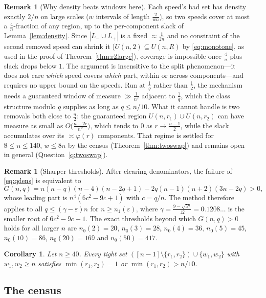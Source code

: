 \documentclass[11pt]{article}
\newtheorem{corollary}[theorem]{Corollary}
\theoremstyle{definition}
\newtheorem{remark}[theorem]{Remark}
\begin{document}
\begin{remark}[Why density beats windows here]\label{rem:density}
Each speed's bad set has density exactly $2/n$ on large scales ($w$
intervals of length $\frac2{wn}$), so two speeds cover at most a
$\tfrac4n$-fraction of any region, up to the per-component slack of
Lemma~\ref{lem:density}. Since $|L_-\cup L_+|$ is a fixed
$\approx\frac1{2n}$ and no constraint of the second removed speed can
shrink it ($U(n,2)\subseteq U(n,R)$ by \eqref{eq:monotone}, as used in
the proof of Theorem~\ref{thm:r2large}), coverage is impossible once
$\tfrac4n$ plus slack drops below $1$. The argument is insensitive to
the split phenomenon---it does not care \emph{which} speed covers
\emph{which} part, within or across components---and requires no upper
bound on the speeds. Run at $\tfrac1q$ rather than $\tfrac12$, the
mechanism needs a guaranteed window of measure $\gg\frac1{n^2}$
adjacent to $\tfrac1q$, which the class structure modulo $q$ supplies as
long as $q\le n/10$. What it cannot handle is two removals both close
to $\tfrac n2$: the guaranteed region $U(n,r_1)\cup U(n,r_2)$ can have
measure as small as $O\bigl(\frac{n-2r}{n^2}\bigr)$, which tends to
$0$ as $r\to\frac{n-1}2$, while the slack accumulates over its
$\asymp\varphi(r)$ components. That regime is settled for $8\le n\le140$,
$w\le8n$ by the census (Theorem~\ref{thm:twoswap}) and remains open in
general (Question~\ref{q:twoswap}).
\end{remark}

\begin{remark}[Sharper thresholds]\label{rem:qrefine}
After clearing denominators, the failure of \eqref{eq:qdens} is
equivalent to
\[
G(n,q)=n(n-q)(n-4)(n-2q+1)-2q(n-1)(n+2)(3n-2q)>0,
\]
whose leading part is $n^4(6c^2-9c+1)$ with $c=q/n$. The method
therefore applies to all $q\le(\gamma-\varepsilon)n$ for
$n\ge n_1(\varepsilon)$, where $\gamma=\frac{9-\sqrt{57}}{12}=0.1208\ldots$
is the smaller root of $6c^2-9c+1$. The exact thresholds beyond which
$G(n,q)>0$ holds for all larger $n$ are $n_0(2)=20$, $n_0(3)=28$,
$n_0(4)=36$, $n_0(5)=45$, $n_0(10)=86$, $n_0(20)=169$ and $n_0(50)=417$.
\end{remark}

\begin{corollary}\label{cor:qcombine}
Let $n\ge40$. Every tight set $([n-1]\setminus\{r_1,r_2\})\cup
\{w_1,w_2\}$ with $w_1,w_2\ge n$ satisfies $\min(r_1,r_2)=1$ or
$\min(r_1,r_2)>n/10$.
\end{corollary}

\subsection{The census}\label{sec:census}
\end{document}
